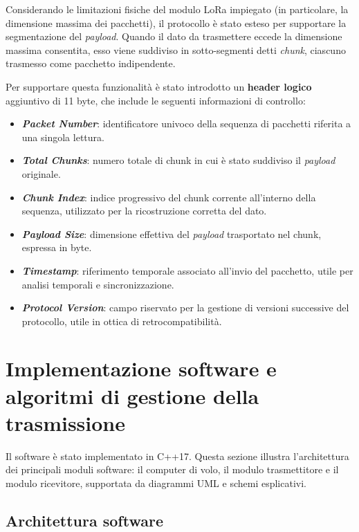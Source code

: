 \documentclass[12pt,a4paper,twoside]{book}
\begin{document}
Considerando le limitazioni fisiche del modulo \ac{LoRa} impiegato (in particolare,
la dimensione massima dei pacchetti), il protocollo è stato esteso per supportare
la segmentazione del \emph{payload}. Quando il dato da trasmettere eccede la dimensione
massima consentita, esso viene suddiviso in sotto-segmenti detti \emph{chunk},
ciascuno trasmesso come pacchetto indipendente.

Per supportare questa funzionalità è stato introdotto un \textbf{header logico}
aggiuntivo di 11 byte, che include le seguenti informazioni di controllo:

\begin{itemize}
    \item \textbf{\emph{Packet Number}}: identificatore univoco della sequenza di pacchetti riferita a una singola lettura.
    \item \textbf{\emph{Total Chunks}}: numero totale di chunk in cui è stato suddiviso il \emph{payload} originale.
    \item \textbf{\emph{Chunk Index}}: indice progressivo del chunk corrente all'interno della sequenza, utilizzato per la ricostruzione corretta del dato.
    \item \textbf{\emph{Payload Size}}: dimensione effettiva del \emph{payload} trasportato nel chunk, espressa in byte.
    \item \textbf{\emph{Timestamp}}: riferimento temporale associato all’invio del pacchetto, utile per analisi temporali e sincronizzazione.
    \item \textbf{\emph{Protocol Version}}: campo riservato per la gestione di versioni successive del protocollo, utile in ottica di retrocompatibilità.
\end{itemize} 

\section{Implementazione software e algoritmi di gestione della trasmissione}
Il software è stato implementato in C++17. Questa sezione illustra l'architettura 
dei principali moduli software: il computer di volo, il modulo trasmettitore e 
il modulo ricevitore, supportata da diagrammi UML e schemi esplicativi.

\subsection{Architettura software}
\end{document}
